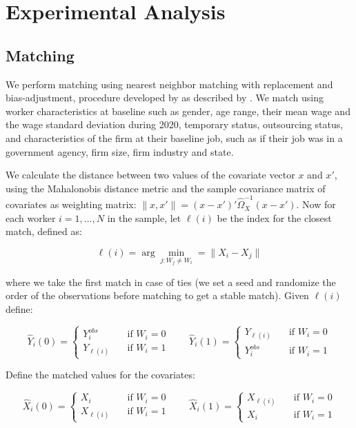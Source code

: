 \documentclass[oneside,11pt]{article}
\begin{document}
\normalsize

\clearpage

\section{Experimental Analysis} \label{experiment}

\subsection{Matching} \label{matching}
We perform matching using nearest neighbor matching with replacement and bias-adjustment, procedure developed by \cite{abadie2006large} as described by \cite{imbens2015matching}. We match using worker characteristics at baseline such as gender, age range, their mean wage and the wage standard deviation during 2020, temporary status, outsourcing status, and characteristics of the firm at their baseline job, such as if their job was in a government agency, firm size, firm industry and state. 

We calculate the distance between two values of the covariate vector $x$ and $x'$, using the Mahalonobis distance metric and the sample covariance matrix of covariates as weighting matrix: $\lVert x,x' \rVert = (x-x')'\hat{\Omega}^{-1}_{X}(x-x')$. Now for each worker $i = 1, \dots, N$ in the sample, let $\ell(i)$ be the index for the closest match, defined as:

$$\ell(i) = \arg \min_{j:W_j \neq W_i} = \rVert X_i - X_j \lVert$$ 

where we take the first match in case of ties (we set a seed and randomize the order of the observations before matching to get a stable match). Given $\ell(i)$ define:

$$\hat{Y}_i(0) = 
\begin{cases}
Y_{i}^{obs} &\quad \text{if } W_i = 0\\ 
Y_{\ell(i)} &\quad \text{if } W_i = 1
\end{cases}
\quad \quad
\hat{Y}_i(1) = 
\begin{cases}
Y_{\ell(i)} &\quad \text{if } W_i = 0\\ 
Y_{i}^{obs} &\quad \text{if } W_i = 1
\end{cases}$$

Define the matched values for the covariates:

$$\hat{X}_i(0) = 
\begin{cases}
X_{i} &\quad \text{if } W_i = 0\\ 
X_{\ell(i)} &\quad \text{if } W_i = 1
\end{cases}
\quad \quad
\hat{X}_i(1) = 
\begin{cases}
X_{\ell(i)} &\quad \text{if } W_i = 0\\ 
X_{i} &\quad \text{if } W_i = 1
\end{cases}$$
\end{document}
